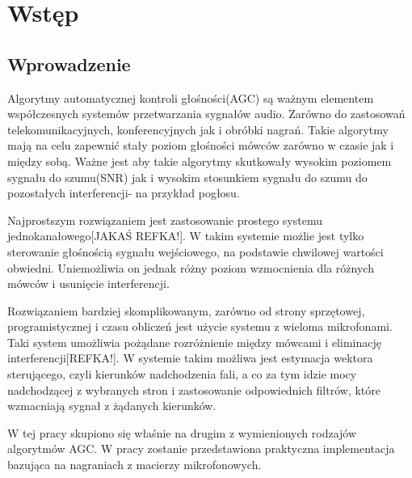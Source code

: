 \chapter{Wstęp}
\section{Wprowadzenie}

Algorytmy automatycznej kontroli głośności(AGC) są ważnym elementem współczesnych systemów przetwarzania sygnałów audio. Zarówno do zastosowań telekomunikacyjnych, konferencyjnych jak i obróbki nagrań. Takie algorytmy mają na celu zapewnić stały poziom głośności mówców zarówno w czasie jak i między sobą.
Ważne jest aby takie algorytmy skutkowały wysokim poziomem sygnału do szumu(SNR) jak i wysokim stosunkiem sygnału do szumu do pozostałych interferencji- na przykład pogłosu.

Najprostszym rozwiązaniem jest zastosowanie prostego systemu jednokanałowego[JAKAŚ REFKA!]. W takim systemie możlie jest tylko sterowanie głośnością sygnału wejściowego, na podstawie chwilowej wartości obwiedni. Uniemożliwia on jednak różny poziom wzmocnienia dla różnych mówców i usunięcie interferencji.

Rozwiązaniem bardziej skomplikowanym, zarówno od strony sprzętowej, programistycznej i czasu obliczeń jest użycie systemu z wieloma mikrofonami. Taki system umożliwia pożądane rozróżnienie między mówcami i eliminację interferencji[REFKA!]. W systemie takim możliwa jest estymacja wektora sterującego, czyli kierunków nadchodzenia fali, a co za tym idzie mocy nadchodzącej z wybranych stron i zastosowanie odpowiednich filtrów, które wzmacniają sygnał z żądanych kierunków.

W tej pracy skupiono się właśnie na drugim z wymienionych rodzajów algorytmów AGC. W pracy zostanie przedstawiona praktyczna implementacja bazująca na nagraniach z macierzy mikrofonowych.


